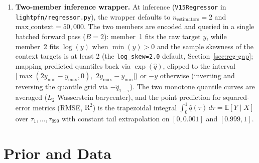 \documentclass[11pt]{article}
\newcommand{\R}{\mathbb{R}}
\newcommand{\E}{\mathbb{E}}
\begin{document}
\begin{enumerate}
\begin{equation}
\hat{\mu} = \hat{m}_1, \qquad \hat{\sigma} = \sqrt{\max\!\big(\hat{m}_2 - \hat{m}_1^2,\; 10^{-6}\big)}.
\label{eq:reg-moments}
\end{equation}
The \texttt{QuantileHead} ($162{,}023$ parameters: $\mathrm{Linear}(258, 128) \to \mathrm{GELU} \to \mathrm{Linear}(128, 999)$) takes $[h_{\text{query}}, \hat{\mu}, \hat{\sigma}] \in \R^{B \times M \times 258}$ and predicts $G=999$ raw scores $r \in \R^{B \times M \times 999}$ for the fixed quantile grid $\tau_k = k/1000$ ($k=1,\dots,999$).
The MLP outputs unconstrained residuals $r_k$. The model shifts and scales them by the retrieved moments, then sorts along the quantile axis:
\begin{equation}
\hat{q}_z(\tau_k) = \operatorname{sort}_{k}\!\left(\hat{\mu}+\hat{\sigma}r_k\right), \qquad k=1,\dots,999.
\label{eq:quantile-head}
\end{equation}
The output layer uses the standard linear-layer initialization; there is no softplus-increment parameterization or normal-quantile initialization. Predictions are unstandardized in \texttt{float64} via $\hat{q}(\tau_k)=\mu_y+\sigma_y\hat{q}_z(\tau_k)$.
Training minimizes mean pinball loss over the 999 levels in standardized units, approximating $\mathrm{CRPS}/(2\sigma_y)$. %
\item \textbf{Two-member inference wrapper.}
At inference (\texttt{V15Regressor} in \texttt{lightpfn/regressor.py}), the wrapper defaults to $n_{\text{estimators}}=2$ and $\text{max\_context}=50{,}000$.
The two members are encoded and queried in a single batched forward pass ($B=2$): member~1 fits the raw target $y$, while member~2 fits $\log(y)$ when $\min(y) > 0$ and the sample skewness of the context targets is at least 2 (the \texttt{log\_skew=2.0} default, Section~\ref{sec:reg-gap}; mapping predicted quantiles back via $\exp(\hat{q})$, clipped to the interval $[\max(2y_{\min}-y_{\max}, 0),$ $2y_{\max}-y_{\min}]$) or $-y$ otherwise (inverting and reversing the quantile grid via $-\hat{q}_{1-\tau}$).
The two monotone quantile curves are averaged ($L_2$ Wasserstein barycenter), and the point prediction for squared-error metrics (RMSE, $\mathrm{R}^2$) is the trapezoidal integral $\int_0^1 \hat{q}(\tau)\,d\tau = \E[Y \mid X]$ over $\tau_1,\dots,\tau_{999}$ with constant tail extrapolation on $[0, 0.001]$ and $[0.999, 1]$.
\end{enumerate}

\section{Prior and Data}
\label{sec:prior}
\end{document}
